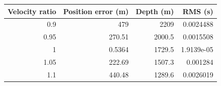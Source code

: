 \begin{tabular}{rrrr}
\toprule Velocity ratio & Position error (m) & Depth (m) & RMS (s) \\
\midrule
0.9 & 479 & 2209 & 0.0024488 \\
0.95 & 270.51 & 2000.5 & 0.0015508 \\
1 & 0.5364 & 1729.5 & 1.9139e-05 \\
1.05 & 222.69 & 1507.3 & 0.001284 \\
1.1 & 440.48 & 1289.6 & 0.0026019 \\
\bottomrule
\end{tabular}
